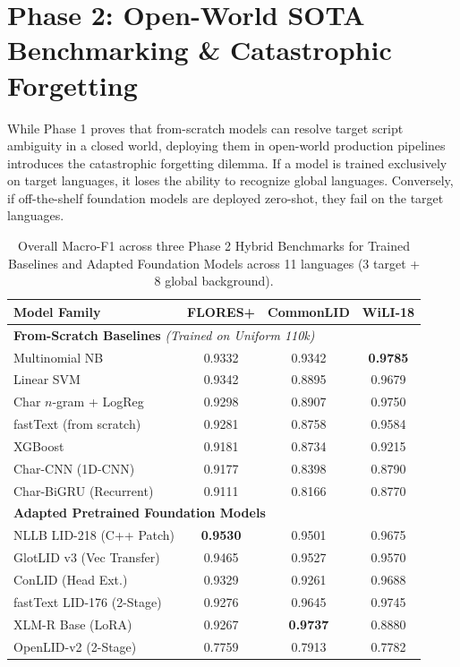 \documentclass[11pt]{article}
\begin{document}
\section{Phase 2: Open-World SOTA Benchmarking \& Catastrophic Forgetting}

While Phase 1 proves that from-scratch models can resolve target script ambiguity in a closed world, deploying them in open-world production pipelines introduces the catastrophic forgetting dilemma. If a model is trained exclusively on target languages, it loses the ability to recognize global languages. Conversely, if off-the-shelf foundation models are deployed zero-shot, they fail on the target languages.

\begin{table}[t]
\centering
\small
\setlength{\tabcolsep}{3.5pt}
\caption{Overall Macro-F1 across three Phase 2 Hybrid Benchmarks for Trained Baselines and Adapted Foundation Models across 11 languages (3 target + 8 global background).}
\label{tab:sota_overall_summary}
\begin{tabular}{l ccc}
\toprule
\textbf{Model Family} & \textbf{FLORES+} & \textbf{CommonLID} & \textbf{WiLI-18} \\
\midrule
\multicolumn{4}{l}{\textbf{From-Scratch Baselines} \textit{(Trained on Uniform 110k)}} \\
Multinomial NB & 0.9332 & 0.9342 & \textbf{0.9785} \\
Linear SVM & 0.9342 & 0.8895 & 0.9679 \\
Char $n$-gram + LogReg & 0.9298 & 0.8907 & 0.9750 \\
fastText (from scratch) & 0.9281 & 0.8758 & 0.9584 \\
XGBoost & 0.9181 & 0.8734 & 0.9215 \\
Char-CNN (1D-CNN) & 0.9177 & 0.8398 & 0.8790 \\
Char-BiGRU (Recurrent) & 0.9111 & 0.8166 & 0.8770 \\
\midrule
\multicolumn{4}{l}{\textbf{Adapted Pretrained Foundation Models}} \\
NLLB LID-218 (C++ Patch) & \textbf{0.9530} & 0.9501 & 0.9675 \\
GlotLID v3 (Vec Transfer) & 0.9465 & 0.9527 & 0.9570 \\
ConLID (Head Ext.) & 0.9329 & 0.9261 & 0.9688 \\
fastText LID-176 (2-Stage) & 0.9276 & 0.9645 & 0.9745 \\
XLM-R Base (LoRA) & 0.9267 & \textbf{0.9737} & 0.8880 \\
OpenLID-v2 (2-Stage) & 0.7759 & 0.7913 & 0.7782 \\
\bottomrule
\end{tabular}
\end{table}
\end{document}
